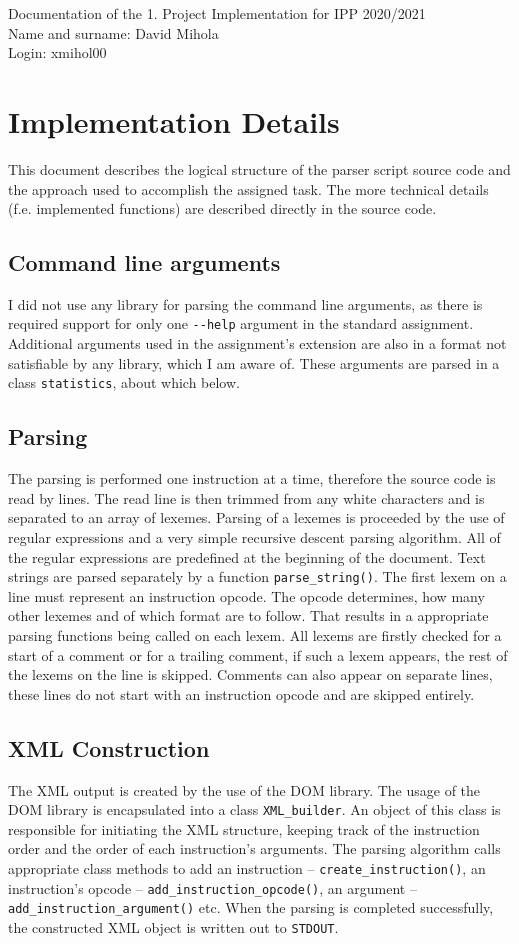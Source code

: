 \documentclass[10pt]{article}
\begin{document}
Documentation of the 1. Project Implementation for IPP 2020/2021
\\Name and surname: David Mihola
\\Login: xmihol00
\section*{Implementation Details}
This document describes the logical structure of the parser script source code and the approach used to accomplish the assigned task. The more technical details (f.e. implemented functions) are described directly in the source code.

\subsection*{Command line arguments}
I did not use any library for parsing the command line arguments, as there is required support for only one \texttt{-\/-help} argument in the standard assignment. Additional arguments used in the assignment's extension are also in a format not satisfiable by any library, which I am aware of. These arguments are parsed in a class \texttt{statistics}, about which below.

\subsection*{Parsing}
The parsing is performed one instruction at a time, therefore the source code is read by lines. The read line is then trimmed from any white characters and is separated to an array of lexemes. Parsing of a lexemes is proceeded by the use of regular expressions and a very simple recursive descent parsing algorithm. All of the regular expressions are predefined at the beginning of the document. Text strings are parsed separately by a function \texttt{parse\_string()}. The first lexem on a line must represent an instruction opcode. The opcode determines, how many other lexemes and of which format are to follow. That results in a appropriate parsing functions being called on each lexem. All lexems are firstly checked for a start of a comment or for a trailing comment, if such a lexem appears, the rest of the lexems on the line is skipped. Comments can also appear on separate lines, these lines do not start with an instruction opcode and are skipped entirely.

\subsection*{XML Construction}
The XML output is created by the use of the DOM library. The usage of the DOM library is encapsulated into a class \texttt{XML\_builder}. An object of this class is responsible for initiating the XML structure, keeping track of the instruction order and the order of each instruction's arguments. The parsing algorithm calls appropriate class methods to add an instruction -- \texttt{create\_instruction()}, an instruction's opcode -- \texttt{add\_instruction\_opcode()}, an argument -- \texttt{add\_instruction\_argument()} etc. When the parsing is completed successfully, the constructed XML object is written out to \texttt{STDOUT}.
\end{document}
